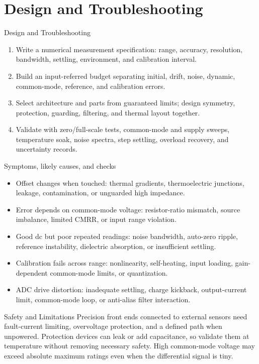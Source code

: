 \documentclass[10pt,letterpaper]{article}
\begin{document}
\section{Design and Troubleshooting}
\begin{CornellExamBox}{Design and Troubleshooting}
\begin{enumerate}
  \item Write a numerical measurement specification: range, accuracy, resolution, bandwidth, settling, environment, and calibration interval.
  \item Build an input-referred budget separating initial, drift, noise, dynamic, common-mode, reference, and calibration errors.
  \item Select architecture and parts from guaranteed limits; design symmetry, protection, guarding, filtering, and thermal layout together.
  \item Validate with zero/full-scale tests, common-mode and supply sweeps, temperature soak, noise spectra, step settling, overload recovery, and uncertainty records.
\end{enumerate}\end{CornellExamBox}
\begin{CornellExamBox}{Symptoms, likely causes, and checks}
\begin{itemize}
  \item Offset changes when touched: thermal gradients, thermoelectric junctions, leakage, contamination, or unguarded high impedance.
  \item Error depends on common-mode voltage: resistor-ratio mismatch, source imbalance, limited CMRR, or input range violation.
  \item Good dc but poor repeated readings: noise bandwidth, auto-zero ripple, reference instability, dielectric absorption, or insufficient settling.
  \item Calibration fails across range: nonlinearity, self-heating, input loading, gain-dependent common-mode limits, or quantization.
  \item ADC drive distortion: inadequate settling, charge kickback, output-current limit, common-mode loop, or anti-alias filter interaction.
\end{itemize}\end{CornellExamBox}
\begin{CornellWarningBox}{Safety and Limitations}
Precision front ends connected to external sensors need fault-current limiting, overvoltage protection, and a defined path when unpowered. Protection devices can leak or add capacitance, so validate them at temperature without removing necessary safety. High common-mode voltage may exceed absolute maximum ratings even when the differential signal is tiny.
\end{CornellWarningBox}
\end{document}
